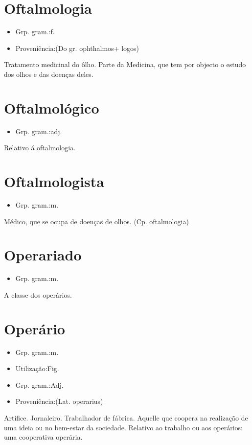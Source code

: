 \section{Oftalmologia}
\begin{itemize}
\item {Grp. gram.:f.}
\end{itemize}
\begin{itemize}
\item {Proveniência:(Do gr. \textunderscore ophthalmos\textunderscore  + \textunderscore logos\textunderscore )}
\end{itemize}
Tratamento medicinal do ôlho.
Parte da Medicina, que tem por objecto o estudo dos olhos e das doenças deles.
\section{Oftalmológico}
\begin{itemize}
\item {Grp. gram.:adj.}
\end{itemize}
Relativo á oftalmologia.
\section{Oftalmologista}
\begin{itemize}
\item {Grp. gram.:m.}
\end{itemize}
Médico, que se ocupa de doenças de olhos.
(Cp. \textunderscore oftalmologia\textunderscore )
\section{Operariado}
\begin{itemize}
\item {Grp. gram.:m.}
\end{itemize}
A classe dos operários.
\section{Operário}
\begin{itemize}
\item {Grp. gram.:m.}
\end{itemize}
\begin{itemize}
\item {Utilização:Fig.}
\end{itemize}
\begin{itemize}
\item {Grp. gram.:Adj.}
\end{itemize}
\begin{itemize}
\item {Proveniência:(Lat. \textunderscore operarius\textunderscore )}
\end{itemize}
Artífice.
Jornaleiro.
Trabalhador de fábrica.
Aquelle que coopera na realização de uma ideia ou no bem-estar da sociedade.
Relativo ao trabalho ou aos operários: \textunderscore uma cooperativa operária\textunderscore .
